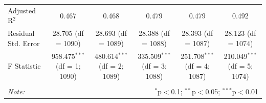 \begin{table}[!htbp]
\begin{tabular}{@{\extracolsep{5pt}}lccccc}
  Adjusted R$^{2}$ & 0.467 & 0.468 & 0.479 & 0.479 & 0.492 \\ 
  Residual Std. Error & 28.705 (df = 1090) & 28.693 (df = 1089) & 28.388 (df = 1088) & 28.393 (df = 1087) & 28.123 (df = 1074) \\ 
  F Statistic & 958.475$^{***}$ (df = 1; 1090) & 480.614$^{***}$ (df = 2; 1089) & 335.509$^{***}$ (df = 3; 1088) & 251.708$^{***}$ (df = 4; 1087) & 210.049$^{***}$ (df = 5; 1074) \\ 
  \hline 
  \hline \\[-1.8ex] 
  \textit{Note:}  & \multicolumn{5}{r}{$^{*}$p$<$0.1; $^{**}$p$<$0.05; $^{***}$p$<$0.01} \\ 
  \end{tabular} 
  \end{table} 